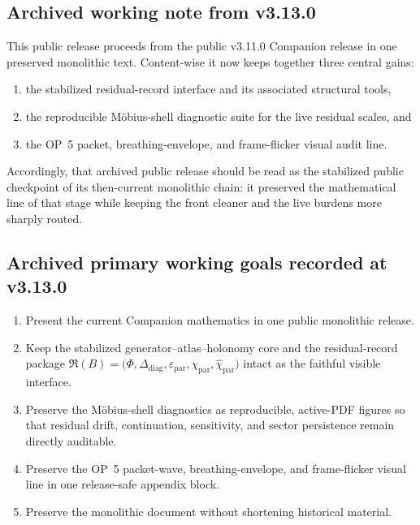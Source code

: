 \subsection*{Archived working note from v3.13.0}
This public release proceeds from the public v3.11.0 Companion release in one preserved monolithic text. Content-wise it now keeps together three central gains:
\begin{enumerate}[leftmargin=2em,label=(\roman*)]
  \item the stabilized residual-record interface and its associated structural tools,
  \item the reproducible M\"obius-shell diagnostic suite for the live residual scales, and
  \item the OP~5 packet, breathing-envelope, and frame-flicker visual audit line.
\end{enumerate}
Accordingly, that archived public release should be read as the stabilized public checkpoint of its then-current monolithic chain: it preserved the mathematical line of that stage while keeping the front cleaner and the live burdens more sharply routed.

\subsection*{Archived primary working goals recorded at v3.13.0}
\begin{enumerate}[leftmargin=2em]
  \item Present the current Companion mathematics in one public monolithic release.
  \item Keep the stabilized generator--atlas--holonomy core and the residual-record package $\mathfrak R(B)=\bigl(\Phi,\Delta_{\mathrm{diag}},\varepsilon_{\mathrm{par}},\chi_{\mathrm{par}},\widehat\chi_{\mathrm{par}}\bigr)$ intact as the faithful visible interface.
  \item Preserve the M\"obius-shell diagnostics as reproducible, active-PDF figures so that residual drift, continuation, sensitivity, and sector persistence remain directly auditable.
  \item Preserve the OP~5 packet-wave, breathing-envelope, and frame-flicker visual line in one release-safe appendix block.
  \item Preserve the monolithic document without shortening historical material.
\end{enumerate}

